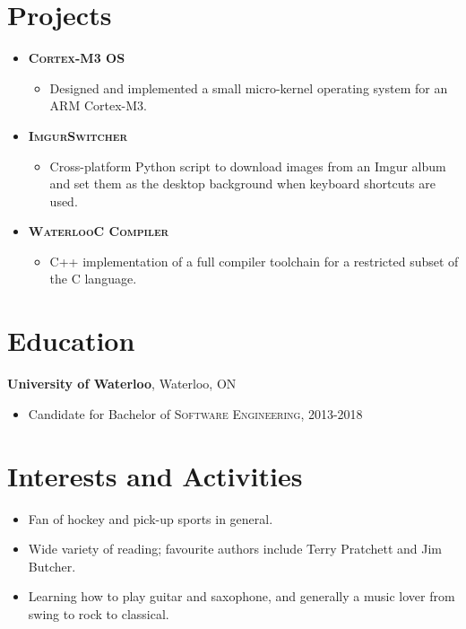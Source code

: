 \documentclass[a4paper,10pt]{article}
\begin{document}
\section{Projects}
\begin{itemize}
	\item {\textsc{\textbf{Cortex-M3 OS}}
	\begin{itemize}
		\item {Designed and implemented a small micro-kernel operating system for an ARM Cortex-M3.}
	\end{itemize}}

	\item {\textsc{\textbf{ImgurSwitcher}}}
	\begin{itemize}
		\item {Cross-platform Python script to download images from an Imgur album and set them as the desktop background when keyboard shortcuts are used.}
	\end{itemize}
	
	\item {\textsc{\textbf{WaterlooC Compiler}}}
	\begin{itemize}
		\item {C++ implementation of a full compiler toolchain for a restricted subset of the C language.}
	\end{itemize}	
\end{itemize}

\section{Education}
\textbf{University of Waterloo}, Waterloo, ON
\begin{itemize}
	\item Candidate for Bachelor of \textsc{Software Engineering}, 2013-2018
\end{itemize}

\section{Interests and Activities}
\begin{itemize}
	\item {Fan of hockey and pick-up sports in general.}
	\item {Wide variety of reading; favourite authors include Terry Pratchett and Jim Butcher.}
	\item {Learning how to play guitar and saxophone, and generally a music lover from swing to rock to classical.}
\end{itemize}
\end{document}
